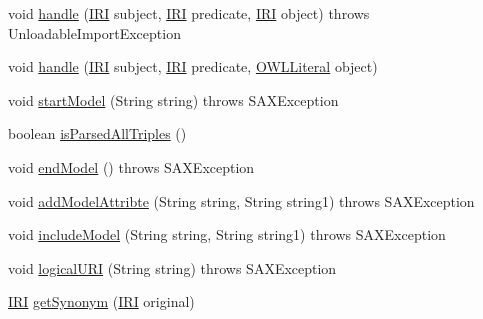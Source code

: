\begin{DoxyCompactItemize}
\item 
void \hyperlink{classorg_1_1coode_1_1owlapi_1_1rdfxml_1_1parser_1_1_o_w_l_r_d_f_consumer_a1c12d21be84b2599b837605db7f16375}{handle} (\hyperlink{classorg_1_1semanticweb_1_1owlapi_1_1model_1_1_i_r_i}{I\-R\-I} subject, \hyperlink{classorg_1_1semanticweb_1_1owlapi_1_1model_1_1_i_r_i}{I\-R\-I} predicate, \hyperlink{classorg_1_1semanticweb_1_1owlapi_1_1model_1_1_i_r_i}{I\-R\-I} object)  throws Unloadable\-Import\-Exception 
\item 
void \hyperlink{classorg_1_1coode_1_1owlapi_1_1rdfxml_1_1parser_1_1_o_w_l_r_d_f_consumer_a26e322a91a36b0960b6bd3b10e293595}{handle} (\hyperlink{classorg_1_1semanticweb_1_1owlapi_1_1model_1_1_i_r_i}{I\-R\-I} subject, \hyperlink{classorg_1_1semanticweb_1_1owlapi_1_1model_1_1_i_r_i}{I\-R\-I} predicate, \hyperlink{interfaceorg_1_1semanticweb_1_1owlapi_1_1model_1_1_o_w_l_literal}{O\-W\-L\-Literal} object)
\item 
void \hyperlink{classorg_1_1coode_1_1owlapi_1_1rdfxml_1_1parser_1_1_o_w_l_r_d_f_consumer_a88ffb649e206299af0f45c433b76b053}{start\-Model} (String string)  throws S\-A\-X\-Exception 
\item 
boolean \hyperlink{classorg_1_1coode_1_1owlapi_1_1rdfxml_1_1parser_1_1_o_w_l_r_d_f_consumer_ab2d4afcfa409af6b4360a466ed767c5e}{is\-Parsed\-All\-Triples} ()
\item 
void \hyperlink{classorg_1_1coode_1_1owlapi_1_1rdfxml_1_1parser_1_1_o_w_l_r_d_f_consumer_ac1eeebfad39d27784f859c35fb19b401}{end\-Model} ()  throws S\-A\-X\-Exception 
\item 
void \hyperlink{classorg_1_1coode_1_1owlapi_1_1rdfxml_1_1parser_1_1_o_w_l_r_d_f_consumer_ae3ed411b971b1982cf4c4bec641c12fe}{add\-Model\-Attribte} (String string, String string1)  throws S\-A\-X\-Exception 
\item 
void \hyperlink{classorg_1_1coode_1_1owlapi_1_1rdfxml_1_1parser_1_1_o_w_l_r_d_f_consumer_ad79151615791a83d62ad487587f2405d}{include\-Model} (String string, String string1)  throws S\-A\-X\-Exception 
\item 
void \hyperlink{classorg_1_1coode_1_1owlapi_1_1rdfxml_1_1parser_1_1_o_w_l_r_d_f_consumer_ab6eb2f36747f1a0eac9be60f226986ac}{logical\-U\-R\-I} (String string)  throws S\-A\-X\-Exception 
\item 
\hyperlink{classorg_1_1semanticweb_1_1owlapi_1_1model_1_1_i_r_i}{I\-R\-I} \hyperlink{classorg_1_1coode_1_1owlapi_1_1rdfxml_1_1parser_1_1_o_w_l_r_d_f_consumer_a1abb57ec8c535e76abf95e38133c4e29}{get\-Synonym} (\hyperlink{classorg_1_1semanticweb_1_1owlapi_1_1model_1_1_i_r_i}{I\-R\-I} original)

\end{DoxyCompactItemize}
